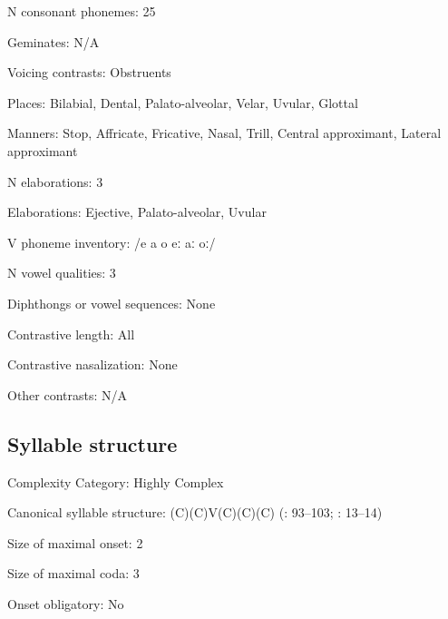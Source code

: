 {\begin{appendixdesc}
\item[N consonant phonemes:] 25

\item[Geminates:] N/A

\item[Voicing contrasts:] Obstruents

\item[Places:] Bilabial, Dental, Palato-alveolar, Velar, Uvular, Glottal

\item[Manners:] Stop, Affricate, Fricative, Nasal, Trill, Central approximant, Lateral approximant

\item[N elaborations:] 3

\item[Elaborations:] Ejective, Palato-alveolar, Uvular

\item[V phoneme inventory:] /e a o eː aː oː/

\item[N vowel qualities:] 3

\item[Diphthongs or vowel sequences:] None

\item[Contrastive length:] All

\item[Contrastive nasalization:] None

\item[Other contrasts:] N/A
\end{appendixdesc}
\subsection*{Syllable structure}
\begin{appendixdesc}

\item[Complexity Category:] Highly Complex

\item[Canonical syllable structure:] (C)(C)V(C)(C)(C) (\citealt{FernándezGaray1998}: 93--103; \citealt{FernándezGarayHernández2006}: 13--14)

\item[Size of maximal onset:] 2

\item[Size of maximal coda:] 3

\item[Onset obligatory:] No


\end{appendixdesc}}
